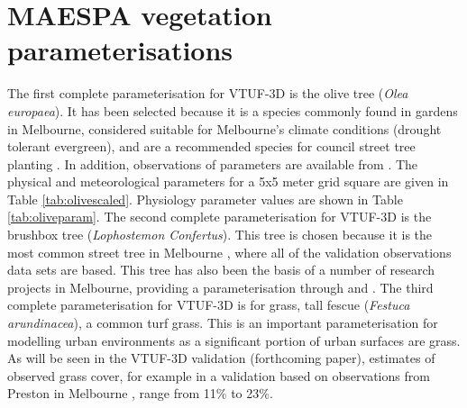 \documentclass[final,3p,times,authoryear]{elsarticle}
\begin{document}

\begin{thebibliography}{00}


\bibitem[ ()]{}

\end{thebibliography}


\appendix
\setcounter{table}{0}
\renewcommand{\thetable}{A\arabic{table}}



\section{MAESPA vegetation parameterisations}\label{sec:maespavegpara}  
%

The first complete parameterisation for VTUF-3D is the olive tree (\textit{Olea europaea}). It has been selected because it is a species commonly found in gardens in Melbourne, considered suitable for Melbourne's climate conditions (drought tolerant evergreen), and are a recommended species for council street tree planting \citep{PortPhillip2010}. In addition, observations of parameters are available from \cite{Coutts2014a}. The physical and meteorological parameters for a 5x5 meter grid square are given in Table \ref{tab:olivescaled}. Physiology parameter values are shown in Table \ref{tab:oliveparam}. The second complete parameterisation for VTUF-3D is the  brushbox tree (\textit{Lophostemon Confertus}). This tree is chosen because it is the most common street tree in Melbourne \citep{Frank2006}, where all of the validation observations data sets are based. This tree has also been the basis of a number of research projects in Melbourne, providing a parameterisation through \cite{Coutts2016} and \cite{Coutts2015ICUC}. The third complete parameterisation for VTUF-3D is for grass, tall fescue (\textit{Festuca arundinacea}), a common turf grass. This is an important parameterisation for modelling urban environments as a significant portion of urban surfaces are grass. As will be seen in the VTUF-3D validation (forthcoming paper), estimates of observed grass cover, for example in a validation based on observations from Preston in Melbourne \citep{Coutts2007,Nury2015}, range from 11\% to 23\%. 
\end{document}
